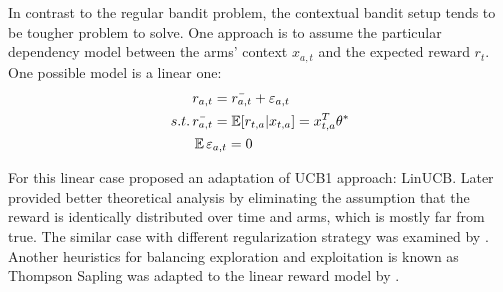 In contrast to the regular bandit problem, the contextual bandit setup tends to be tougher problem to solve. One approach is to assume the particular dependency model between the arms' context $x_{a,t}$ and the expected reward $r_t$. One possible model is a linear one: \begin{align}
        &\label{eq:reward_linear_assumption}
        r_{a,t} = \bar{r_{a,t}} + \varepsilon_{a,t} \\
        s.t.\, & \bar{r_{a,t}}  = \operatorname{\mathbb{E}}[r_{t,a}|x_{t,a}] = x_{t,a}^T\theta^* \\
        & \operatorname{\mathbb{E}} \varepsilon_{a,t}  = 0 
    \end{align}
    
    For this linear case \cite{Li2010} proposed an adaptation of UCB1 approach: LinUCB. Later \cite{Abbasi-Yadkori2011} provided better theoretical analysis by eliminating the assumption that the reward is identically distributed over time and arms, which is mostly far from true. The similar case with different regularization strategy was examined by \cite{Auer2003}. Another heuristics for balancing exploration and exploitation is known as Thompson Sapling was adapted to the linear reward model by \cite{Agrawal2013}. 
